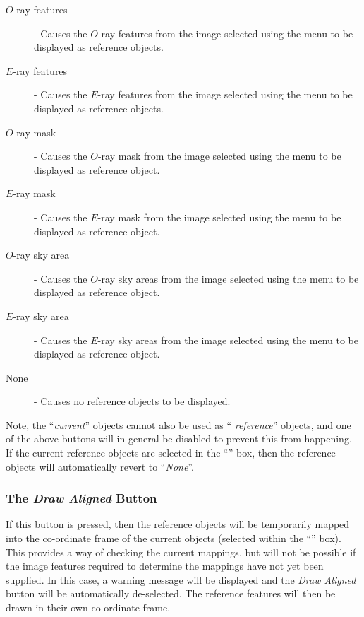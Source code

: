 \begin{description}

\item [$O$-ray features] - Causes the $O$-ray features from the image
selected using the  menu to
be displayed as reference objects.

\item [$E$-ray features] - Causes the $E$-ray features from the image
selected using the  menu to
be displayed as reference objects.

\item [$O$-ray mask] - Causes the $O$-ray mask from the image
selected using the  menu to
be displayed as reference object.

\item [$E$-ray mask] - Causes the $E$-ray mask from the image
selected using the  menu to
be displayed as reference object.

\item [$O$-ray sky area] - Causes the $O$-ray sky areas from the image
selected using the  menu to
be displayed as reference object.

\item [$E$-ray sky area] - Causes the $E$-ray sky areas from the image
selected using the  menu to
be displayed as reference object.

\item [None] - Causes no reference objects to be displayed.

\end{description}

Note, the ``{\em current}'' objects cannot also be used as ``{\em
reference}'' objects, and one of the above buttons will in general be
disabled to prevent this from happening. If the current reference objects are
selected in the ``'' box, then the 
reference objects will automatically revert to ``{\em None}''.

\subsubsection {The {\em Draw Aligned} Button}
If this button is pressed, then the reference objects will be temporarily
mapped into the co-ordinate frame of the current objects (selected within
the ``'' box). This provides a
way of checking the current mappings, but will not be possible if the
image features required to determine the mappings have not yet been
supplied. In this case, a warning message will be displayed and the {\em
Draw Aligned} button will be automatically de-selected. The reference
features will then be drawn in their own co-ordinate frame.

